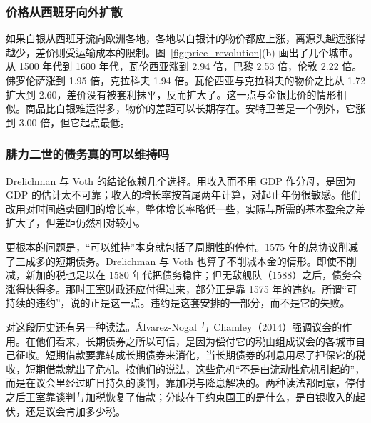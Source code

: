 \subsubsection{价格从西班牙向外扩散}
如果白银从西班牙流向欧洲各地，各地以白银计的物价都应上涨，离源头越远涨得越少，差价则受运输成本的限制。图~\ref{fig:price_revolution}(b) 画出了几个城市。从 1500 年代到 1600 年代，瓦伦西亚涨到 2.94 倍，巴黎 2.53 倍，伦敦 2.22 倍。佛罗伦萨涨到 1.95 倍，克拉科夫 1.94 倍。瓦伦西亚与克拉科夫的物价之比从 1.72 扩大到 2.60，差价没有被套利抹平，反而扩大了。这一点与金银比价的情形相似。商品比白银难运得多，物价的差距可以长期存在。安特卫普是一个例外，它涨到 3.00 倍，但它起点最低。


\subsubsection{腓力二世的债务真的可以维持吗}
Drelichman 与 Voth 的结论依赖几个选择。用收入而不用 GDP 作分母，是因为 GDP 的估计太不可靠；收入的增长率按首尾两年计算，对起止年份很敏感。他们改用对时间趋势回归的增长率，整体增长率略低一些，实际与所需的基本盈余之差扩大了，但差距仍然相对较小\cite{dv2010}。

更根本的问题是，“可以维持”本身就包括了周期性的停付。1575 年的总协议削减了三成多的短期债务。Drelichman 与 Voth 也算了不削减本金的情形。即使不削减，新加的税也足以在 1580 年代把债务稳住；但无敌舰队（1588）之后，债务会涨得快得多。那时王室财政还应付得过来，部分正是靠 1575 年的违约\cite{dv2010}。所谓“可持续的违约”，说的正是这一点。违约是这套安排的一部分，而不是它的失败。

对这段历史还有另一种读法。Álvarez-Nogal 与 Chamley（2014）强调议会的作用。在他们看来，长期债券之所以可信，是因为偿付它的税由组成议会的各城市自己征收。短期借款要靠转成长期债券来消化，当长期债券的利息用尽了担保它的税收，短期借款就出了危机。按他们的说法，这些危机“不是由流动性危机引起的”，而是在议会里经过旷日持久的谈判，靠加税与降息解决的\cite{ac2014}。两种读法都同意，停付之后王室靠谈判与加税恢复了借款；分歧在于约束国王的是什么，是白银收入的起伏，还是议会肯加多少税。

